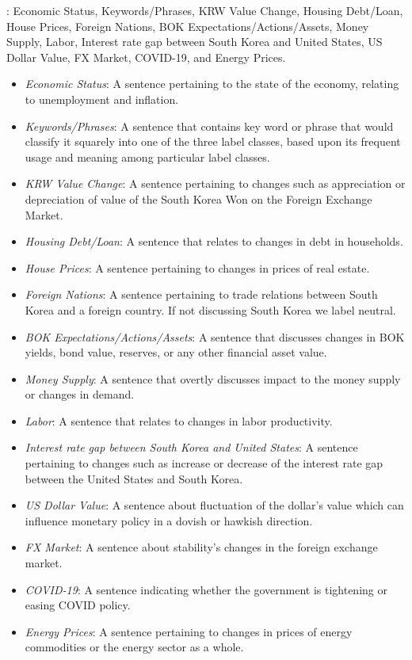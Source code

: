 : Economic Status, Keywords/Phrases, KRW Value Change, Housing Debt/Loan, House Prices, Foreign Nations, BOK Expectations/Actions/Assets, Money Supply, Labor, Interest rate gap between South Korea and United States, US Dollar Value, FX Market, COVID-19, and Energy Prices.

\begin{itemize}
    \item \textit{Economic Status}: A sentence pertaining to the state of the economy, relating to unemployment and inflation.
    \item \textit{Keywords/Phrases}: A sentence that contains key word or phrase that would classify it squarely into one of the three label classes, based upon its frequent usage and meaning among particular label classes.
    \item \textit{KRW Value Change}: A sentence pertaining to changes such as appreciation or depreciation of value of the South Korea Won on the Foreign Exchange Market.
    \item \textit{Housing Debt/Loan}: A sentence that relates to changes in debt in households.
    \item \textit{House Prices}: A sentence pertaining to changes in prices of real estate.
    \item \textit{Foreign Nations}: A sentence pertaining to trade relations between South Korea and a foreign country. If not discussing South Korea we label neutral.
    \item \textit{BOK Expectations/Actions/Assets}: A sentence that discusses changes in BOK yields, bond value, reserves, or any other financial asset value.
    \item \textit{Money Supply}: A sentence that overtly discusses impact to the money supply or changes in demand.
    \item \textit{Labor}: A sentence that relates to changes in labor productivity.
    \item \textit{Interest rate gap between South Korea and United States}: A sentence pertaining to changes such as increase or decrease of the interest rate gap between the United States and South Korea.
    \item \textit{US Dollar Value}: A sentence about fluctuation of the dollar’s value which can influence monetary policy in a dovish or hawkish direction.
    \item \textit{FX Market}: A sentence about stability’s changes in the foreign exchange market.
    \item \textit{COVID-19}: A sentence indicating whether the government is tightening or easing COVID policy.
    \item \textit{Energy Prices}: A sentence pertaining to changes in prices of energy commodities or the energy sector as a whole.
\end{itemize}



